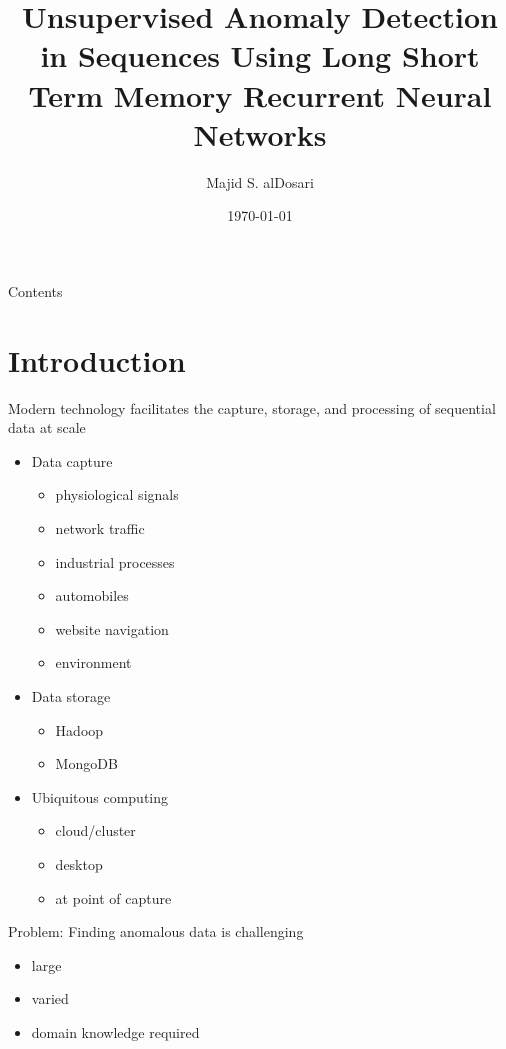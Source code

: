 \documentclass{beamer}
\title{Unsupervised Anomaly Detection in Sequences
Using Long Short Term Memory Recurrent Neural Networks}
\date{\today} %
\author{Majid S. alDosari}
\institute{George Mason University}
\begin{document}
  \maketitle

  \begin{frame}[allowframebreaks]{Contents}
    \tableofcontents 
  \end{frame}

  \section{Introduction}

  \begin{frame}{Modern technology facilitates the 
      capture, storage, and processing of sequential data at scale}

    \begin{itemize}
    \item Data capture
      \begin{itemize}
      \item physiological signals
      \item network traffic
      \item industrial processes
      \item automobiles
      \item website navigation
      \item environment
      \end{itemize}
    \item Data storage
      \begin{itemize}
      \item Hadoop
      \item MongoDB
      \end{itemize}
    \item Ubiquitous computing
      \begin{itemize}
      \item cloud/cluster
      \item desktop
      \item at point of capture
      \end{itemize}
    \end{itemize}    


  \end{frame}


  \begin{frame}{Problem: Finding anomalous data is challenging}

    \begin{itemize}
    \item large 
    \item varied
    \item domain knowledge required
    \end{itemize}

  \end{frame}
\end{document}
